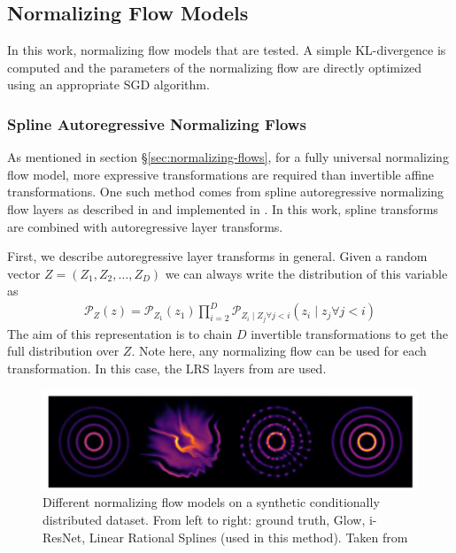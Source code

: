 \subsection{Normalizing Flow Models}
In this work, normalizing flow models that are tested. A simple KL-divergence is computed and the parameters of the normalizing flow are directly optimized using an appropriate SGD algorithm.

\subsubsection{Spline Autoregressive Normalizing Flows}
As mentioned in section \S\ref{sec:normalizing-flows}, for a fully universal normalizing flow model, more expressive transformations are required than invertible affine transformations. One such method comes from spline autoregressive normalizing flow layers as described in \cite{dolatabadi_invertible_2020} and implemented in \cite{durkan_neural_2019}. In this work, spline transforms are combined with autoregressive layer transforms.

First, we describe autoregressive layer transforms in general. Given a random vector $Z = (Z_1, Z_2, \dots, Z_D)$ we can always write the distribution of this variable as
\begin{align*}
	\mathcal{P}_Z(z) = \mathcal{P}_{Z_1}(z_1)\prod_{i=2}^D \mathcal{P}_{Z_i \mid Z_j \forall j < i}(z_i \mid z_j \forall j < i)
\end{align*}
The aim of this representation is to chain $D$ invertible transformations to get the full distribution over $Z$. Note here, any normalizing flow can be used for each transformation. In this case, the LRS layers from \cite{dolatabadi_invertible_2020} are used.
\begin{figure}[h]
	\centering
	\includegraphics[width=\textwidth]{images/coupling-flow.png}
	\caption{Different normalizing flow models on a synthetic conditionally distributed dataset. From left to right: ground truth, Glow, i-ResNet, Linear Rational Splines (used in this method). Taken from \cite{dolatabadi_invertible_2020}}
	\label{fig:coupling-flow}
\end{figure}

